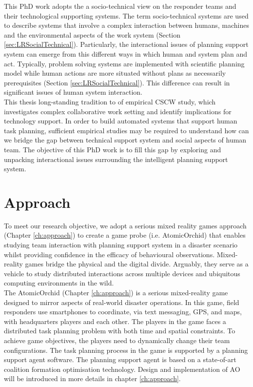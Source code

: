 This PhD work adopts the a socio-technical view on the responder teams and their technological supporting systems. The term socio-technical systems are used to describe systems that involve a complex interaction between humans, machines and the environmental aspects of the work system (Section \ref{sec:LRSocialTechnical}). Particularly, the interactional issues of planning support system can emerge from this different ways in which human and system plan and act. Typically, problem solving systems are implemented with scientific planning model while human actions are more situated without plans as necessarily prerequisites (Section \ref{sec:LRSocialTechnical}). This difference can result in significant issues of human system interaction.\\

This thesis long-standing tradition to of empirical \ac{CSCW} study, which investigates complex collaborative work setting and identify implications for technology support. In order to build automated systems that support human task planning, sufficient empirical studies may be required to understand how can we bridge the gap between technical support system and social aspects of human team.  The objective of this PhD work is to fill this gap by exploring and unpacking interactional issues surrounding the intelligent planning support system.\\

\section{Approach}\label{sec:custom}


To meet our research objective, we adopt a serious mixed reality games approach (Chapter \ref{ch:approach}) to create a game probe (i.e. AtomicOrchid) that enables studying team interaction with planning support system in a disaster scenario whilst providing confidence in the efficacy of behavioural observations. Mixed-reality games bridge the physical and the digital divide. Arguably, they serve as a vehicle to study distributed interactions across multiple devices and ubiquitous computing environments in the wild.\\

The AtomicOrchid (Chapter \ref{ch:approach}) is a serious mixed-reality game designed to mirror aspects of real-world disaster operations. In this game, field responders use smartphones to coordinate, via text messaging, GPS, and maps, with headquarters players and each other. The players in the game faces a distributed task planning problem with both time and spatial constraints. To achieve game objectives, the players need to dynamically change their team configurations. The task planning process in the game is supported by a planning support agent software. The planning support agent is based on a state-of-art coalition formation optimisation technology. Design and implementation of \acf{AO} will be introduced in more details in chapter \ref{ch:approach}.\\


